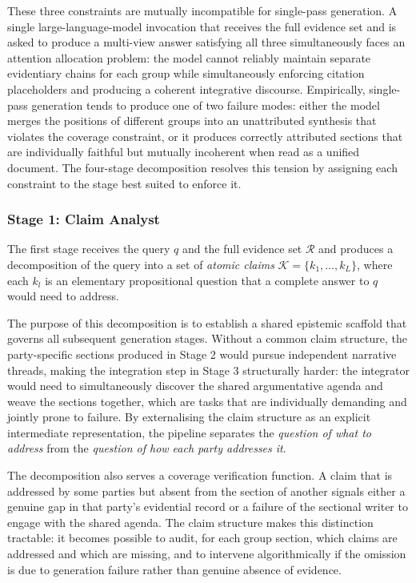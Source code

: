 These three constraints are mutually incompatible for single-pass generation. A single
large-language-model invocation that receives the full evidence set and is asked to produce a
multi-view answer satisfying all three simultaneously faces an attention allocation problem: the
model cannot reliably maintain separate evidentiary chains for each group while simultaneously
enforcing citation placeholders and producing a coherent integrative discourse. Empirically,
single-pass generation tends to produce one of two failure modes: either the model merges the
positions of different groups into an unattributed synthesis that violates the coverage
constraint, or it produces correctly attributed sections that are individually faithful but
mutually incoherent when read as a unified document. The four-stage decomposition resolves
this tension by assigning each constraint to the stage best suited to enforce it.

\subsubsection{Stage 1: Claim Analyst}

The first stage receives the query $q$ and the full evidence set $\mathcal{R}$ and produces a
decomposition of the query into a set of \textit{atomic claims} $\mathcal{K} = \{k_1, \ldots,
k_L\}$, where each $k_l$ is an elementary propositional question that a complete answer to $q$
would need to address.

The purpose of this decomposition is to establish a shared epistemic scaffold that governs all
subsequent generation stages. Without a common claim structure, the party-specific sections
produced in Stage 2 would pursue independent narrative threads, making the integration step in
Stage 3 structurally harder: the integrator would need to simultaneously discover the shared
argumentative agenda and weave the sections together, which are tasks that are individually
demanding and jointly prone to failure. By externalising the claim structure as an explicit
intermediate representation, the pipeline separates the \textit{question of what to address}
from the \textit{question of how each party addresses it}.

The decomposition also serves a coverage verification function. A claim that is addressed by
some parties but absent from the section of another signals either a genuine gap in that party's
evidential record or a failure of the sectional writer to engage with the shared agenda. The
claim structure makes this distinction tractable: it becomes possible to audit, for each group
section, which claims are addressed and which are missing, and to intervene algorithmically if
the omission is due to generation failure rather than genuine absence of evidence.


